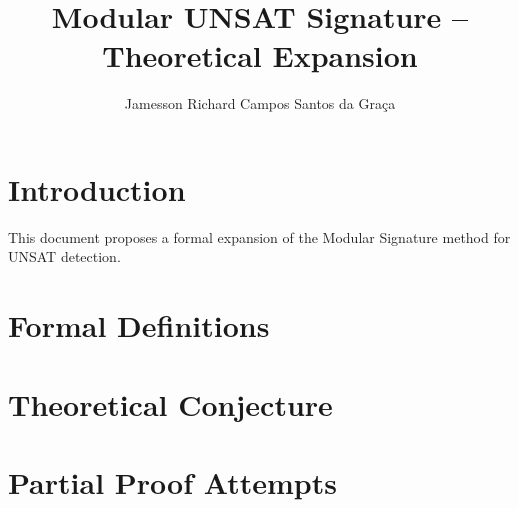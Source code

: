 \documentclass{article}
\title{Modular UNSAT Signature – Theoretical Expansion}
\author{Jamesson Richard Campos Santos da Graça}
\date{}
\begin{document}
\maketitle

\section{Introduction}
This document proposes a formal expansion of the Modular Signature method for UNSAT detection.

\section{Formal Definitions}

\section{Theoretical Conjecture}

\section{Partial Proof Attempts}
\end{document}
